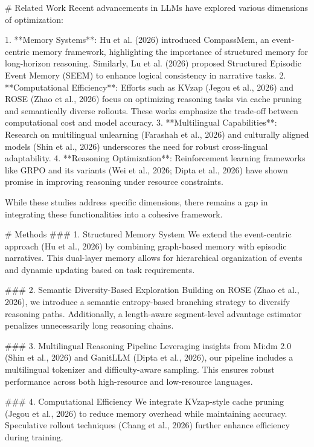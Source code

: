 # Related Work  
Recent advancements in LLMs have explored various dimensions of optimization:  

1. **Memory Systems**: Hu et al. (2026) introduced CompassMem, an event-centric memory framework, highlighting the importance of structured memory for long-horizon reasoning. Similarly, Lu et al. (2026) proposed Structured Episodic Event Memory (SEEM) to enhance logical consistency in narrative tasks.  
2. **Computational Efficiency**: Efforts such as KVzap (Jegou et al., 2026) and ROSE (Zhao et al., 2026) focus on optimizing reasoning tasks via cache pruning and semantically diverse rollouts. These works emphasize the trade-off between computational cost and model accuracy.  
3. **Multilingual Capabilities**: Research on multilingual unlearning (Farashah et al., 2026) and culturally aligned models (Shin et al., 2026) underscores the need for robust cross-lingual adaptability.  
4. **Reasoning Optimization**: Reinforcement learning frameworks like GRPO and its variants (Wei et al., 2026; Dipta et al., 2026) have shown promise in improving reasoning under resource constraints.  

While these studies address specific dimensions, there remains a gap in integrating these functionalities into a cohesive framework.  

# Methods  
### 1. Structured Memory System  
We extend the event-centric approach (Hu et al., 2026) by combining graph-based memory with episodic narratives. This dual-layer memory allows for hierarchical organization of events and dynamic updating based on task requirements.  

### 2. Semantic Diversity-Based Exploration  
Building on ROSE (Zhao et al., 2026), we introduce a semantic entropy-based branching strategy to diversify reasoning paths. Additionally, a length-aware segment-level advantage estimator penalizes unnecessarily long reasoning chains.  

### 3. Multilingual Reasoning Pipeline  
Leveraging insights from Mi:dm 2.0 (Shin et al., 2026) and GanitLLM (Dipta et al., 2026), our pipeline includes a multilingual tokenizer and difficulty-aware sampling. This ensures robust performance across both high-resource and low-resource languages.  

### 4. Computational Efficiency  
We integrate KVzap-style cache pruning (Jegou et al., 2026) to reduce memory overhead while maintaining accuracy. Speculative rollout techniques (Chang et al., 2026) further enhance efficiency during training.  


